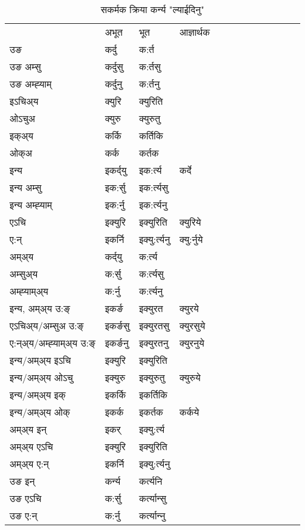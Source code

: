 \begin{table}[H]
\label{urt.vt} \centering
\caption{सकर्मक क्रिया  कर्न्य  "ल्याईदिनु"  }
\begin{tabular}{l|l|l|l|l|l|l|l|l|l|l|l|l}  \toprule
&अभूत & भूत & आज्ञार्थक \\ 
उङ &कर्दु &क:र्त \\ 
उङ अम्सु&कर्दुसु &क:र्तसु \\ 
उङ अम्ह्‍याम्&कर्दुनु &क:र्तनु \\ 
इऽचिअ्य &क्युरि &क्युरिति   \\ 
ओऽचुअ        &क्युरु &क्युरुतु   \\ 
इक्अ्य&कर्कि &कर्तिकि   \\ 
ओक्अ &कर्क &कर्तक   \\ 
इन्य & इकर्द्‌यु  & इक:र्त्य &कर्दे  \\ 
इन्य अम्सु& इक:र्सु  & इक:र्त्यसु   \\ 
इन्य अम्ह्‍याम्& इक:र्नु  & इक:र्त्यनु   \\ 
एऽचि & इक्युरि & इक्युरिति &क्युरिये    \\ 
ए:न् & इकर्नि  & इक्यु:र्त्यनु &क्यु:र्नुये  \\ 
अम्अ्य & कर्द्‌यु  & क:र्त्य  \\ 
अम्सुअ्य & क:र्सु & क:र्त्यसु  \\ 
अम्ह्‍याम्अ्य & क:र्नु  & क:र्त्यनु \\ 
\midrule
इन्य, अम्अ्य उ:ङ्‌ &इकर्ङ &इक्युरत &क्युरये \\ 
एऽचिअ्य/अम्सुअ उ:ङ्‌ &इकर्ङसु &इक्युरतसु &क्युरसुये \\ 
ए:न्अ्य/अम्ह्‍याम्अ्य उ:ङ्‌ &इकर्ङनु &इक्युरतनु &क्युरनुये \\ 
इन्य/अम्अ्य इऽचि &इक्युरि &इक्युरिति    \\ 
इन्य/अम्अ्य ओऽचु &इक्युरु &इक्युरुतु  &क्युरुये  \\ 
इन्य/अम्अ्य इक् &इकर्कि &इकर्तिकि   \\ 
इन्य/अम्अ्य ओक् &इकर्क &इकर्तक  &कर्कये  \\ 
अम्अ्य इन् & इकर् & इक्यु:र्त्य   \\ 
अम्अ्य एऽचि & इक्युरि & इक्युरिति    \\ 
अम्अ्य ए:न् & इकर्नि  & इक्यु:र्त्यनु  \\ 
\midrule
उङ इन् & कर्न्य  & कर्त्यनि  \\ 
उङ एऽचि & क:र्सु  & कर्त्यान्सु   \\ 
उङ ए:न्& क:र्नु  & कर्त्यान्‍नु   \\ 
\bottomrule
\end{tabular}
\end{table}
